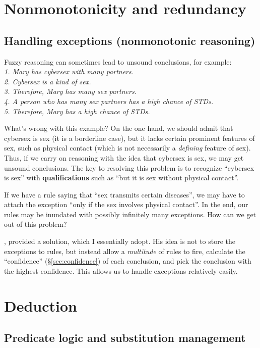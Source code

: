\section{Nonmonotonicity and redundancy}

\subsection{Handling exceptions (nonmonotonic reasoning)}
\label{sec:exceptions}

Fuzzy reasoning can sometimes lead to unsound conclusions, for example:\\
\textit{1. Mary has cybersex with many partners.\\
2. Cybersex is a kind of sex.\\
3. Therefore, Mary has many sex partners.\\
4. A person who has many sex partners has a high chance of STDs.\\
5. Therefore, Mary has a high chance of STDs.}

What's wrong with this example?  On the one hand, we should admit that cybersex is sex (it is a borderline case), but it lacks certain prominent features of sex, such as physical contact (which is not necessarily a \textit{defining} feature of sex).  Thus, if we carry on reasoning with the idea that cybersex is sex, we may get unsound conclusions.  The key to resolving this problem is to recognize ``cybersex is sex'' with \textbf{qualifications} such as ``but it is sex without physical contact''.

If we have a rule saying that ``sex transmits certain diseases'', we may have to attach the exception ``only if the sex involves physical contact''.  In the end, our rules may be inundated with possibly infinitely many exceptions.  How can we get out of this problem?

\citep*{Wang1994}, \citep*{Wang2006} provided a solution, which I essentially adopt.  His idea is not to store the exceptions to rules, but instead allow a \textit{multitude} of rules to fire, calculate the ``confidence'' (\S\ref{sec:confidence}) of each conclusion, and pick the conclusion with the highest confidence.  This allows us to handle exceptions relatively easily.

\section{Deduction}
\label{sec:deduction}

\subsection{Predicate logic and substitution management}
\label{sec:substitution-management}


